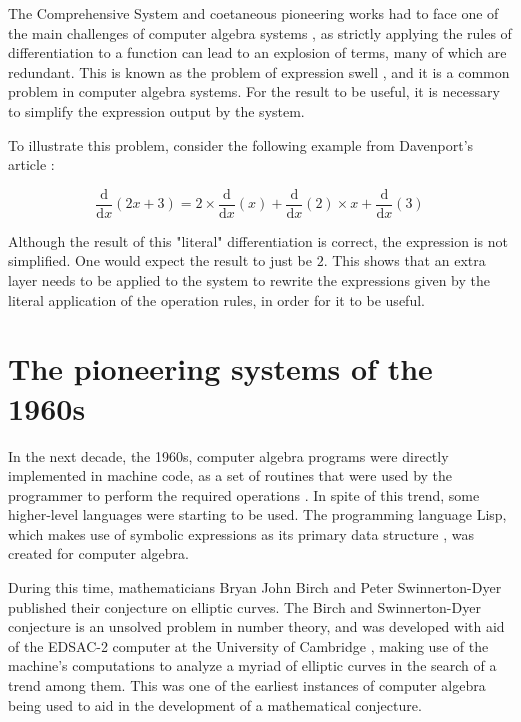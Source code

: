 The Comprehensive System and coetaneous pioneering works had to face one of the main challenges of computer algebra systems \parencite{davenport1994computer}, as strictly applying the rules of differentiation to a function can lead to an explosion of terms, many of which are redundant. This is known as the problem of expression swell \parencite{laue2019equivalence}, and it is a common problem in computer algebra systems. For the result to be useful, it is necessary to simplify the expression output by the system.

To illustrate this problem, consider the following example from Davenport's article \parencite{davenport1994computer}:

\begin{equation}
    \frac{\mathrm{d}}{\mathrm{d}x} \left( 2x + 3 \right) = 2 \times \frac{\mathrm{d}}{\mathrm{d}x} \left( x \right) + \frac{\mathrm{d}}{\mathrm{d}x} \left( 2 \right) \times x + \frac{\mathrm{d}}{\mathrm{d}x} \left( 3 \right)
\end{equation}

Although the result of this "literal" differentiation is correct, the expression is not simplified. One would expect the result to just be $2$. This shows that an extra layer needs to be applied to the system to rewrite the expressions given by the literal application of the operation rules, in order for it to be useful.

\section{The pioneering systems of the 1960s}\label{sec:the-pioneering-systems-of-the-1960s}

In the next decade, the 1960s, computer algebra programs were directly implemented in machine code, as a set of routines that were used by the programmer to perform the required operations \parencite{davenport1994computer}. In spite of this trend, some higher-level languages were starting to be used. The programming language Lisp, which makes use of symbolic expressions as its primary data structure \parencite{mccarthy1960recursive}, was created for computer algebra.

During this time, mathematicians Bryan John Birch and Peter Swinnerton-Dyer published their conjecture on elliptic curves. The Birch and Swinnerton-Dyer conjecture is an unsolved problem in number theory, and was developed with aid of the EDSAC-2 computer at the University of Cambridge \parencite{birch1965notes}, making use of the machine's computations to analyze a myriad of elliptic curves in the search of a trend among them. This was one of the earliest instances of computer algebra being used to aid in the development of a mathematical conjecture.


